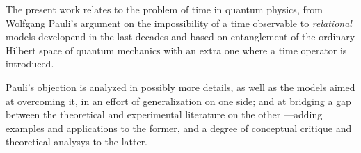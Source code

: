 The present work relates to the problem of time in quantum physics,
from Wolfgang Pauli's argument
on the impossibility of a time observable \parencite{PauliFootnote}
to \emph{relational} models developend in the last decades and based
on entanglement of the ordinary Hilbert space of quantum mechanics
with an extra one where a time operator is introduced.

Pauli's objection is analyzed in possibly more details, as well as the models
aimed at overcoming it, in an effort of generalization on one side;
and at bridging a gap between the theoretical
and experimental literature on the other
---adding examples and applications to the former,
and a degree of conceptual critique and theoretical analysys to the latter.
